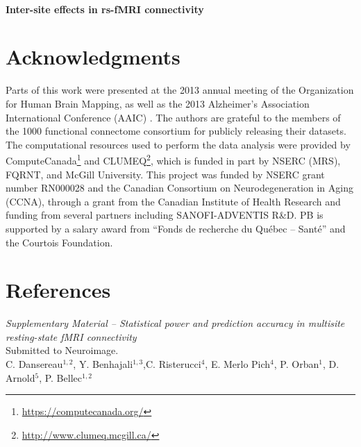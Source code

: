 \documentclass[authoryear]{elsarticle}
\begin{document}
\paragraph{Inter-site effects in rs-fMRI connectivity} 


\section{Acknowledgments}
Parts of this work were presented at the 2013 annual meeting of the Organization for Human Brain Mapping, as well as the 2013 Alzheimer's Association International Conference (AAIC) \citep{Dansereau2013b}. The authors are grateful to the members of the 1000 functional connectome consortium for publicly releasing their datasets. The computational resources used to perform the data analysis were provided by ComputeCanada\footnote{\url{https://computecanada.org/}} and CLUMEQ\footnote{\url{http://www.clumeq.mcgill.ca/}}, which is funded in part by NSERC (MRS), FQRNT, and McGill University. This project was funded by NSERC grant number RN000028 and the Canadian
Consortium on Neurodegeneration in Aging (CCNA), through a grant from
the Canadian Institute of Health Research and funding from several partners including SANOFI-ADVENTIS R\&D. PB is supported by a salary award from ``Fonds de recherche du Qu\'ebec -- Sant\'e'' and the Courtois Foundation.

\section*{References}





\pagebreak



\clearpage
\appendix


\clearpage
\pagebreak
\renewcommand{\thefigure}{S\arabic{figure}}
\renewcommand{\thetable}{S\arabic{table}}
\setcounter{figure}{0}
\begin{center}
\emph{Supplementary Material {--} Statistical power and prediction accuracy in multisite resting-state fMRI connectivity}\\

\vspace{\baselineskip}Submitted to Neuroimage.\\

\vspace{\baselineskip}C. Dansereau$^{1,2}$,  Y. Benhajali$^{1,3}$,C. Risterucci$^{4}$, E. Merlo Pich$^{4}$, P. Orban$^{1}$, D. Arnold$^{5}$, P. Bellec$^{1,2}$\\

\end{center}
\end{document}
